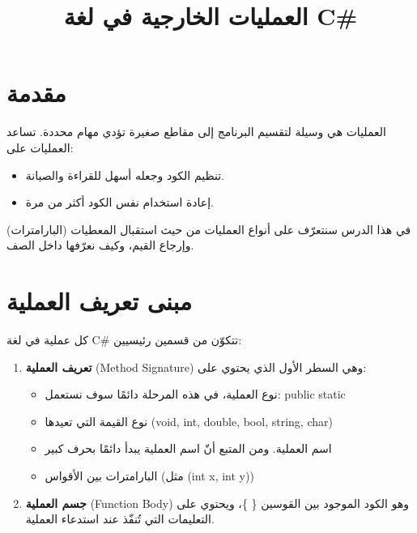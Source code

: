 \documentclass[12pt]{article}
\title{العمليات الخارجية في لغة \textenglish{C\#} }
\begin{document}
\maketitle

\section*{مقدمة}
العمليات هي وسيلة لتقسيم البرنامج إلى مقاطع صغيرة تؤدي مهام محددة.
تساعد العمليات على:
\begin{itemize}
    \item تنظيم الكود وجعله أسهل للقراءة والصيانة.
    \item إعادة استخدام نفس الكود أكثر من مرة.
\end{itemize}

في هذا الدرس سنتعرّف على أنواع العمليات من حيث استقبال المعطيات (البارامترات) وإرجاع القيم، وكيف نعرّفها داخل الصف.

\section{مبنى تعريف العملية}
كل عملية في لغة C\# تتكوّن من قسمين رئيسيين:

\begin{enumerate}
    \item \textbf{تعريف العملية} \textenglish{(Method Signature)}
    وهي السطر الأول الذي يحتوي على:
    \begin{itemize}
        \item نوع العملية، في هذه المرحلة دائمًا سوف نستعمل: \textenglish{public static}
        \item نوع القيمة التي تعيدها (\textenglish{void, int, double, bool, string, char})
        \item اسم العملية. ومن المتبع أنّ اسم العملية يبدأ دائمًا بحرف كبير
        \item البارامترات بين الأقواس (مثل \textenglish{(int x, int y)})
    \end{itemize}

    \item \textbf{جسم العملية} \textenglish{(Function Body)}
    وهو الكود الموجود بين القوسين \textenglish{\{ \}}، ويحتوي على التعليمات التي تُنفّذ عند استدعاء العملية.
\end{enumerate}
\end{document}
